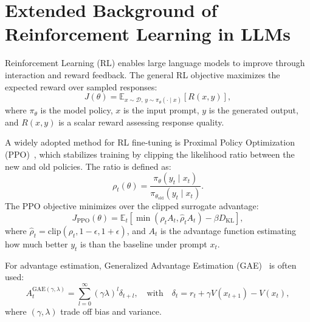\appendix
\section{Extended Background of Reinforcement Learning in LLMs}
\label{app:background_rl}

Reinforcement Learning (RL) enables large language models to improve through interaction and reward feedback. The general RL objective maximizes the expected reward over sampled responses:
\begin{equation}
    J(\theta) = \mathbb{E}_{x \sim \mathcal{D},\, y \sim \pi_\theta(\cdot \mid x)} \left[ R(x, y) \right],
\end{equation}
where \( \pi_\theta \) is the model policy, \( x \) is the input prompt, \( y \) is the generated output, and \( R(x, y) \) is a scalar reward assessing response quality.

A widely adopted method for RL fine-tuning is Proximal Policy Optimization (PPO)~\citep{ppo}, which stabilizes training by clipping the likelihood ratio between the new and old policies. The ratio is defined as:
\begin{equation}
    \rho_t(\theta) = \frac{\pi_\theta(y_t \mid x_t)}{\pi_{\theta_{\text{old}}}(y_t \mid x_t)}.
\end{equation}
The PPO objective minimizes over the clipped surrogate advantage:
\begin{equation}
    J_{\text{PPO}}(\theta) = \mathbb{E}_t \left[ \min\left( \rho_t A_t, \hat{\rho}_t A_t \right) - \beta D_{\mathrm{KL}} \right],
\end{equation}
where \( \hat{\rho}_t = \text{clip}(\rho_t, 1 - \epsilon, 1 + \epsilon) \), and \( A_t \) is the advantage function estimating how much better \( y_t \) is than the baseline under prompt \( x_t \).

For advantage estimation, Generalized Advantage Estimation (GAE)~\citep{schulman2015GAE} is often used:
\begin{equation}
    A_t^{\mathrm{GAE}(\gamma, \lambda)} = \sum_{l=0}^{\infty} (\gamma \lambda)^l \delta_{t+l}, \quad \text{with} \quad \delta_t = r_t + \gamma V(x_{t+1}) - V(x_t),
\end{equation}
where \( (\gamma, \lambda) \) trade off bias and variance.

